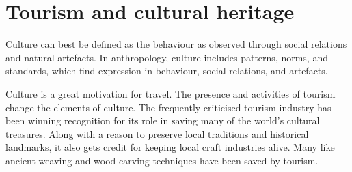 
\section{Tourism and cultural heritage} %
\label{sec:tch}

Culture can best be defined as the behaviour as observed through social relations and natural artefacts. In anthropology, culture includes patterns, norms, and standards, which find expression in behaviour, social relations, and artefacts.

Culture is a great motivation for travel. The presence and activities of tourism change the elements of culture. The frequently criticised tourism industry has been winning recognition for its role in saving many of the world's cultural treasures. Along with a reason to preserve local traditions and historical landmarks, it also gets credit for keeping local craft industries alive. Many like ancient weaving and wood carving techniques have been saved by tourism.


